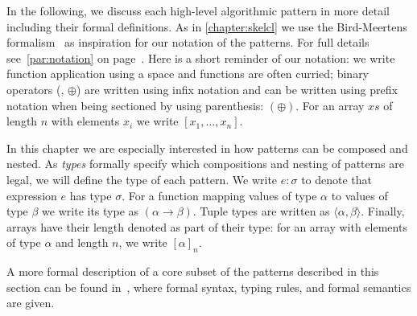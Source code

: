 In the following, we discuss each high-level algorithmic pattern in more detail including their formal definitions.
As in \autoref{chapter:skelcl} we use the Bird-Meertens formalism~\cite{Bird88} as inspiration for our notation of the patterns.
For full details see~\autoref{par:notation} on page~\pageref{par:notation}.
Here is a short reminder of our notation:
we write function application using a space and functions are often curried;
binary operators (\eg, $\oplus$) are written using infix notation and can be written using prefix notation when being sectioned by using parenthesis: $(\oplus)$.
For an array $xs$ of length $n$ with elements $x_i$ we write $[x_1, \ldots, x_n]$.

In this chapter we are especially interested in how patterns can be composed and nested.
As \emph{types} formally specify which compositions and nesting of patterns are legal, we will define the type of each pattern.
We write $e : \sigma$ to denote that expression $e$ has type $\sigma$.
For a function mapping values of type $\alpha$ to values of type $\beta$ we write its type as $(\alpha \rightarrow \beta)$.
Tuple types are written as $\langle\alpha, \beta\rangle$.
Finally, arrays have their length denoted as part of their type:
for an array with elements of type $\alpha$ and length $n$, we write $[\alpha]_n$.

A more formal description of a core subset of the patterns described in this section can be found in~\cite{SteuwerFeLiDu2015}, where formal syntax, typing rules, and formal semantics are given.

